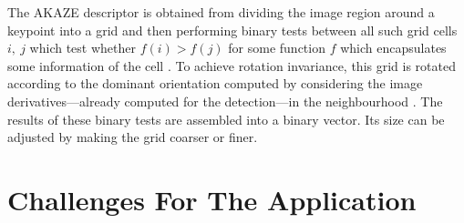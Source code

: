 The AKAZE descriptor is obtained from dividing the image region around a
keypoint into a grid and then performing binary tests between all such grid
cells $i,~j$ which test whether $f(i) > f(j)$ for some function $f$ which
encapsulates some information of the cell \citep{yang2012}. To achieve rotation
invariance, this grid is rotated according to the dominant orientation computed
by considering the image derivatives---already computed for the detection---in
the neighbourhood \citep{alcantarilla2012}. The results of these binary tests are
assembled into a binary vector. Its size can be adjusted by making the grid
coarser or finer.

\section{Challenges For The Application}
\label{sec:app_challenges}


